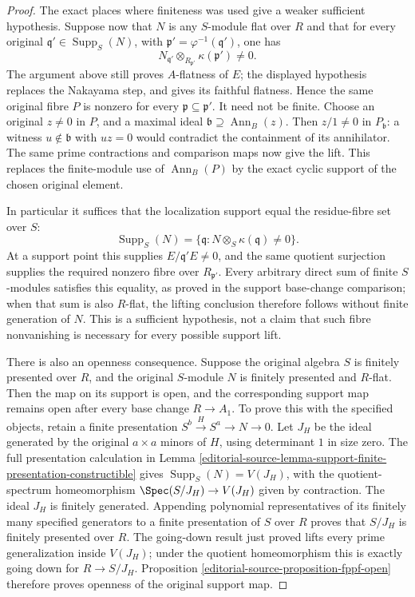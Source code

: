 \begin{proof}
\medskip\noindent
The exact places where finiteness was used give
a weaker sufficient hypothesis. Suppose now that
$N$ is any $S$-module flat over $R$ and that for
every original $\mathfrak q'\in\operatorname{Supp}_S(N)$,
with $\mathfrak p'=\varphi^{-1}(\mathfrak q')$, one has
$$
N_{\mathfrak q'}\otimes_{R_{\mathfrak p'}}
\kappa(\mathfrak p')\ne0.
$$
The argument above still proves $A$-flatness of
$E$; the displayed hypothesis replaces the
Nakayama step, and gives its faithful flatness.
Hence the same original fibre $P$ is nonzero
for every $\mathfrak p\subseteq\mathfrak p'$.
It need not be finite. Choose an original
$z\ne0$ in $P$, and a maximal ideal
$\mathfrak b\supseteq\operatorname{Ann}_B(z)$.
Then $z/1\ne0$ in $P_{\mathfrak b}$: a witness
$u\notin\mathfrak b$ with $uz=0$ would contradict
the containment of its annihilator. The same
prime contractions and comparison maps now give
the lift. This replaces the finite-module use
of $\operatorname{Ann}_B(P)$ by the exact cyclic
support of the chosen original element.

In particular it suffices that the localization
support equal the residue-fibre set over $S$:
$$
\operatorname{Supp}_S(N)
=\{\mathfrak q:N\otimes_S\kappa(\mathfrak q)\ne0\}.
$$
At a support point this supplies
$E/\mathfrak q'E\ne0$, and the same quotient
surjection supplies the required nonzero fibre
over $R_{\mathfrak p'}$. Every arbitrary direct
sum of finite $S$-modules satisfies this equality,
as proved in the support base-change comparison;
when that sum is also $R$-flat, the lifting
conclusion therefore follows without finite
generation of $N$. This is a sufficient hypothesis,
not a claim that such fibre nonvanishing is
necessary for every possible support lift.

\medskip\noindent
There is also an openness consequence. Suppose the
original algebra $S$ is finitely presented over $R$,
and the original $S$-module $N$ is finitely presented
and $R$-flat. Then the map on its support is open,
and the corresponding support map remains open
after every base change $R\to A_1$.
To prove this with the specified objects, retain
a finite presentation $S^b\xrightarrow{H}S^a\to N\to0$.
Let $J_H$ be the ideal generated by the original
$a\times a$ minors of $H$, using determinant $1$
in size zero. The full presentation calculation in
Lemma \ref{editorial-source-lemma-support-finite-presentation-constructible}
gives $\operatorname{Supp}_S(N)=V(J_H)$, with the
quotient-spectrum homeomorphism
$\Spec(S/J_H)\to V(J_H)$ given by contraction.
The ideal $J_H$ is finitely generated. Appending
polynomial representatives of its finitely many
specified generators to a finite presentation of
$S$ over $R$ proves that $S/J_H$ is finitely
presented over $R$. The going-down result just
proved lifts every prime generalization inside
$V(J_H)$; under the quotient homeomorphism this
is exactly going down for $R\to S/J_H$.
Proposition \ref{editorial-source-proposition-fppf-open} therefore
proves openness of the original support map.


\end{proof}
